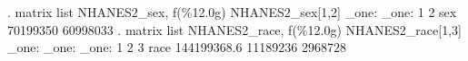 . matrix list NHANES2_sex, f(\%12.0g)
{\smallskip}
NHANES2_sex[1,2]
         _one:     _one:
            1         2
sex  70199350  60998033
{\smallskip}
. matrix list NHANES2_race, f(\%12.0g)
{\smallskip}
NHANES2_race[1,3]
             _one:        _one:        _one:
                1            2            3
race  144199368.6     11189236      2968728
{\smallskip}
